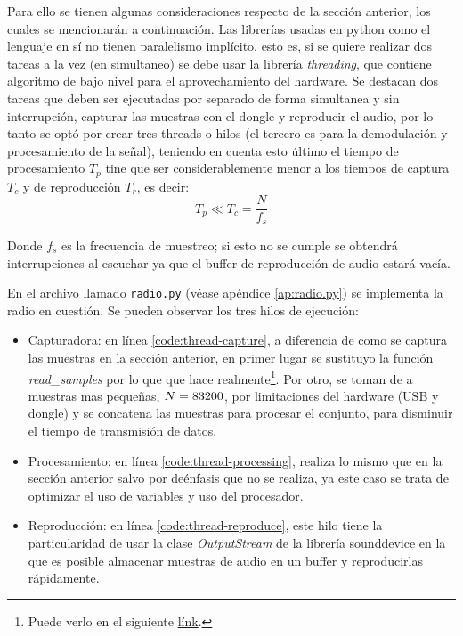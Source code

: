 Para ello se tienen algunas consideraciones respecto de la sección anterior, los cuales se mencionarán a continuación.
Las librerías usadas en python como el lenguaje en sí no tienen paralelismo implícito, esto es, si se quiere realizar dos tareas a la vez (en simultaneo) se debe usar la librería \emph{threading}, que contiene algoritmo de bajo nivel para el aprovechamiento del hardware.
Se destacan dos tareas que deben ser ejecutadas por separado de forma simultanea y sin interrupción, capturar las muestras con el dongle y reproducir el audio, por lo tanto se optó por crear tres threads o hilos (el tercero es para la demodulación y procesamiento de la señal), teniendo en cuenta esto último el tiempo de procesamiento $T_p$ tine que ser considerablemente menor a los tiempos de captura $T_c$ y de reproducción $T_r$, es decir:
$$
	T_p \ll T_c = \frac{N}{f_s}
$$

Donde $f_s$ es la frecuencia de muestreo; si esto no se cumple se obtendrá interrupciones al escuchar ya que el buffer de reproducción de audio estará vacía.

En el archivo llamado \texttt{radio.py} (véase apéndice \ref{ap:radio.py}) se implementa la radio en cuestión. Se pueden observar los tres hilos de ejecución: 
\begin{itemize}
	\item Capturadora: en línea \ref{code:thread-capture}, a diferencia de como se captura las muestras en la sección anterior, en primer lugar se sustituyo la función \emph{read\_samples} por lo que que hace realmente\footnote{Puede verlo en el siguiente \href{https://github.com/roger-/pyrtlsdr/blob/master/rtlsdr/rtlsdr.py\#L480}{línk}.}.
	Por otro, se toman de a muestras mas pequeñas, $N = 83200$, por limitaciones del hardware (USB y dongle) y se concatena las muestras para procesar el conjunto, para disminuir el tiempo de transmisión de datos.
	
	\item Procesamiento: en línea \ref{code:thread-processing}, realiza lo mismo que en la sección anterior salvo por deénfasis que no se realiza, ya este caso se trata de optimizar el uso de variables y uso del procesador.

	\item Reproducción: en línea \ref{code:thread-reproduce}, este hilo tiene la particularidad de usar la clase \emph{OutputStream} de la librería sounddevice en la que es posible almacenar muestras de audio en un buffer y reproducirlas rápidamente.
\end{itemize}

